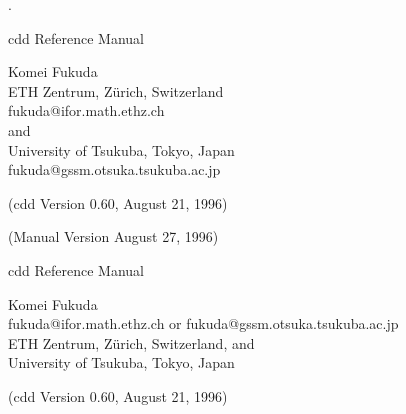 %
\renewcommand{\baselinestretch}{1.0}
\setlength{\oddsidemargin}{8mm}
\setlength{\textwidth}{16cm}
\setlength{\topmargin}{0mm}
\setlength{\textheight}{23cm}
\setlength{\headsep}{0in}
\setlength{\headheight}{0pt}

\pagestyle{empty}



.\vspace{20mm}

\begin{center}

\vspace{20mm}

{\LARGE cdd Reference Manual}

\vspace{20mm}

{\Large Komei Fukuda\\
   ETH Zentrum, Z\"urich, Switzerland\\
   fukuda@ifor.math.ethz.ch\\
   and\\
   University of Tsukuba, Tokyo, Japan\\
  fukuda@gssm.otsuka.tsukuba.ac.jp
}

\vspace{20mm}
{\Large (cdd Version 0.60,  August 21, 1996)}

{\Large (Manual  Version  August 27, 1996)}

\end{center}

\newpage
\pagestyle{plain}
\setcounter{page}{1} 

\begin{center}

{\Large cdd Reference Manual}

\bigskip
{\large Komei Fukuda\\
   fukuda@ifor.math.ethz.ch  or  fukuda@gssm.otsuka.tsukuba.ac.jp\\
   ETH Zentrum, Z\"urich, Switzerland, and\\
   University of Tsukuba, Tokyo, Japan}

\bigskip
{\large (cdd Version 0.60,  August 21, 1996)}

\end{center}

